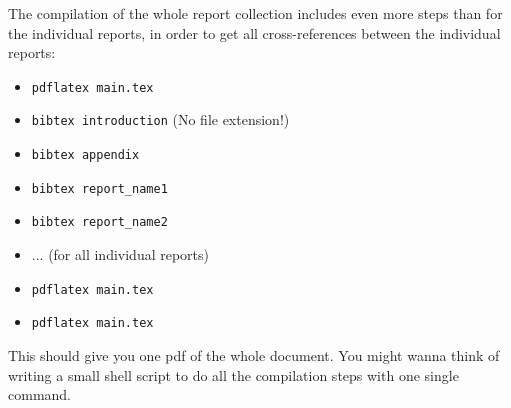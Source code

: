 \documentclass[11pt,a4paper]{article}
\begin{document}
The compilation of the whole report collection includes even more steps than for the individual reports, in order to get all cross-references between the individual reports:
\begin{itemize}
    \item \texttt{pdflatex main.tex}
    \item \texttt{bibtex introduction} (No file extension!)
    \item \texttt{bibtex appendix}
    \item \texttt{bibtex report\_name1}
    \item \texttt{bibtex report\_name2}
    \item ... (for all individual reports)
    \item \texttt{pdflatex main.tex}
    \item \texttt{pdflatex main.tex}
\end{itemize}
This should give you one pdf of the whole document. You might wanna think of writing a small shell script to do all the compilation steps with one single command.
\end{document}
